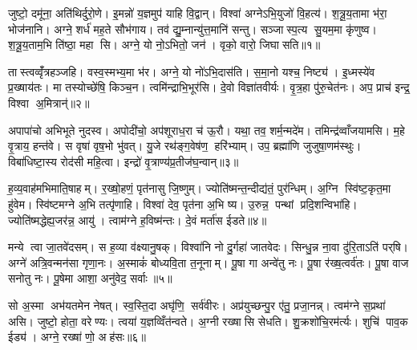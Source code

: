 

\clearpage
{}
\setcounter{anuvakam}{0}
जुष्टो॒ दमू॑ना॒ अति॑थिर्दुरो॒णे। इ॒मन्नो॑ य॒ज्ञमुप॑ याहि वि॒द्वान्। विश्वा॑ अग्नेऽभि॒युजो॑ वि॒हत्य॑। श॒त्रू॒य॒तामा भ॑रा॒ भोज॑नानि। अग्ने॒ शर्ध॑ मह॒ते सौभ॑गाय। तव॑ द्यु॒म्नान्यु॑त्त॒मानि॑ सन्तु। सञ्जास्प॒त्य सु॒यम॒मा कृ॑णुष्व। श॒त्रू॒य॒ताम॒भि ति॑ष्ठा॒ महा सि। अग्ने॒ यो नो॒ऽभितो॒ जन॑। वृको॒ वारो॒ जिघासति॥१॥

तास्त्वव्वृँ॑त्रहञ्जहि। वस्व॒स्मभ्य॒मा भ॑र। अग्ने॒ यो नो॑ऽभि॒दास॑ति। स॒मा॒नो यश्च॒ निष्ट्य॑। इ॒ध्मस्ये॑व प्र॒ख्षाय॑तः। मा तस्योच्छे॑षि॒ किञ्च॒न। त्वमि॑न्द्राभि॒भूर॑सि। दे॒वो विज्ञा॑तवीर्यः। वृ॒त्र॒हा पु॑रु॒चेत॑नः। अप॒ प्राच॑ इन्द्र॒ विश्वा अ॒मित्रान्॑॥२॥

अपापा॑चो अभिभूते नुदस्व। अपोदी॑चो॒ अप॑शूराध॒रा च॑ ऊ॒रौ। यथा॒ तव॒ शर्म॒न्मदे॑म। तमिन्द्र॑व्वाँजयामसि। म॒हे वृ॒त्राय॒ हन्त॑वे। स वृषा॑ वृष॒भो भु॑वत्। यु॒जे रथ॑ङ्ग॒वेष॑ण॒ हरि॑भ्याम्। उप॒ ब्रह्मा॑णि जुजुषा॒णम॑स्थुः। विबा॑धिष्टा॒स्य रोद॑सी महि॒त्वा। इन्द्रो॑ वृ॒त्राण्य॑प्र॒तीज॑घ॒न्वान्॥३॥

ह॒व्य॒वाह॑मभिमाति॒षाहम्। र॒ख्षो॒हणं॒ पृत॑नासु जि॒ष्णुम्। ज्योति॑ष्मन्त॒न्दीद्य॑तं॒ पुर॑न्धिम्। अ॒ग्नि स्वि॑ष्ट॒कृत॒मा हु॑वेम। स्वि॑ष्टमग्ने अ॒भि तत्पृ॑णाहि। विश्वा॑ देव॒ पृत॑ना अ॒भि ष्य। उ॒रुन्न॒ पन्थां प्रदि॒शन्विभा॑हि। ज्योति॑ष्मद्धेह्य॒जर॑न्न॒ आयु॑। त्वाम॑ग्ने ह॒विष्म॑न्तः। दे॒वं मर्ता॑स ईडते॥४॥

मन्ये त्वा जा॒तवे॑दसम्। स ह॒व्या व॑क्ष्यानु॒षक्। विश्वा॑नि नो दु॒र्गहा॑ जातवेदः। सिन्धु॒न्न ना॒वा दु॑रि॒ताऽति॑ पर्‌षि। अग्ने॑ अत्रि॒वन्मन॑सा गृणा॒नः। अ॒स्माकं॑ बोध्यवि॒ता त॒नूनाम्। पू॒षा गा अन्वे॑तु नः। पू॒षा र॑ख्ष॒त्वर्व॑तः। पू॒षा वाज सनोतु नः। पू॒षेमा आशा॒ अनु॑वेद॒ सर्वाः॥५॥

सो अ॒स्मा अभ॑यतमेन नेषत्। स्व॒स्ति॒दा अघृ॑णि॒ सर्व॑वीरः। अप्र॑युच्छन्पु॒र ए॑तु॒ प्रजा॒नन्न्। त्वम॑ग्ने स॒प्रथा॑ असि। जुष्टो॒ होता॒ वरेण्यः। त्वया॑ य॒ज्ञव्विँत॑न्वते। अ॒ग्नी रख्षासि सेधति। शु॒क्रशो॑चि॒रम॑र्त्यः। शुचि॑ पाव॒क ईड्य॑। अग्ने॒ रख्षा॑ णो॒ अह॑सः॥६॥

